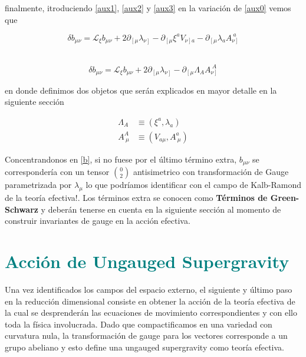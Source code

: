 \documentclass{article}
\numberwithin{equation}{section}
\begin{document}
finalmente, itroduciendo \ref{aux1}, \ref{aux2} y \ref{aux3} en la variación de \ref{aux0} vemos que

\begin{equation*}
\delta b_{\mu \nu} = \mathcal{L}_{\xi} b_{\mu \nu}+ 2 \partial_{\left[\mu \right.} \lambda_{\left. \nu \right]} - \partial_{\left[\mu \right.} \xi^a V_{\left. \nu \right] a} - \partial_{\left[\mu \right.} \lambda_a A_{\left. \nu \right]}^{\ a} 
\end{equation*}\\

\begin{boxquation}
	\begin{equation}\label{b}
	\delta b_{\mu \nu} = \mathcal{L}_{\xi} b_{\mu \nu} + 2 \partial_{\left[\mu \right.} \lambda_{\left. \nu \right]} - \partial_{\left[\mu \right.} \Lambda_A A^{\ A}_{\left. \nu \right]}
	\end{equation}
\end{boxquation}

en donde definimos dos objetos que serán explicados en mayor detalle en la siguiente sección

\begin{equation}\label{ADFT}
\begin{aligned}
\Lambda_A &\equiv \left( \xi^a, \lambda_a \right)\\
A_{\ \mu}^{A} &\equiv \left( V_{a \mu}, A_{\ \mu}^{ a} \right)
\end{aligned}
\end{equation}

Concentrandonos en \ref{b}, si no fuese por el último término extra, $ b_{\mu \nu} $ se correspondería con un tensor $ \binom{0}{2} $ antisimetrico con transformación de Gauge parametrizada por $ \lambda_{\mu} $ lo que podríamos identificar con el campo de Kalb-Ramond de la teoría efectiva!. Los términos extra se conocen como \textbf{Términos de Green-Schwarz} y deberán tenerse en cuenta en la siguiente sección al momento de construir invariantes de gauge en la acción efectiva.


\section{\textcolor{teal}{Acción de Ungauged Supergravity}}


Una vez identificados los campos del espacio externo, el siguiente y último paso en la reducción dimensional consiste en obtener la acción de la teoría efectiva de la cual se desprenderán las ecuaciones de movimiento correspondientes y con ello toda la física involucrada. Dado que compactificamos en una variedad con curvatura nula, la transformación de gauge para los vectores corresponde a un grupo abeliano y esto define una ungauged supergravity como teoría efectiva. 
\end{document}
